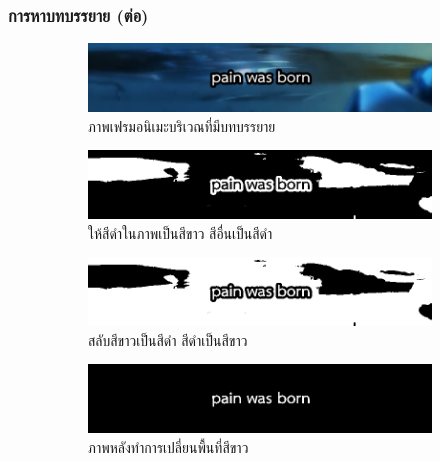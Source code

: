 \documentclass[xcolor=dvipsnames, xetex,serif]{beamer}
\numberwithin{equation}{section}
\begin{document}
    \begin{frame}
        \frametitle{การหาบทบรรยาย (ต่อ)}
        \begin{figure}[H]
            \begin{subfigure}{0.4\linewidth}
                \centering
                \includegraphics[width=0.8\linewidth]{images/subtitle_detection/detection-original.png}
                \caption{ภาพเฟรมอนิเมะบริเวณที่มีบทบรรยาย}
            \end{subfigure}
            \begin{subfigure}{0.4\linewidth}
                \centering
                \includegraphics[width=0.8\linewidth]{images/subtitle_detection/detection-threshold.png}
                \caption{ให้สีดำในภาพเป็นสีขาว สีอื่นเป็นสีดำ }
            \end{subfigure}
            \begin{subfigure}{0.4\linewidth}
                \centering
                \includegraphics[width=0.8\linewidth]{images/subtitle_detection/detection-inverse.png}
                \caption{สลับสีขาวเป็นสีดำ สีดำเป็นสีขาว}
            \end{subfigure}
            \begin{subfigure}{0.4\linewidth}
                \centering
                \includegraphics[width=0.8\linewidth]{images/subtitle_detection/detection-blackfill.png}
                \caption{ภาพหลังทำการเปลี่ยนพื้นที่สีขาว}
            \end{subfigure}
            \begin{subfigure}{0.4\linewidth}

\end{subfigure}
\end{figure}
\end{frame}
\end{document}
